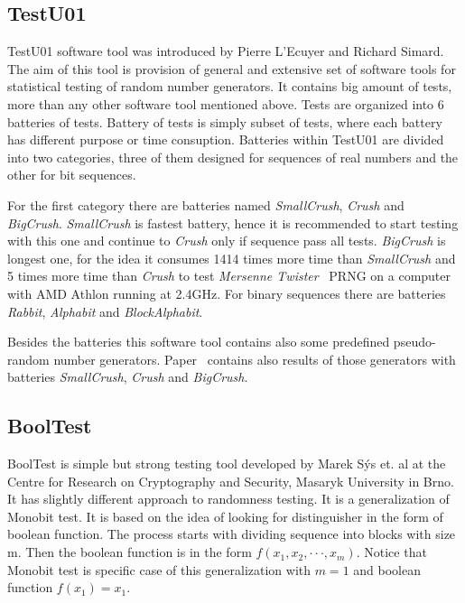 \documentclass[
    digital,    %
    oneside,    %
    color,
    11pt,
    nocover,
    notable,
    nolof,
    nolot,
    final
]{fithesis3}
\begin{document}
\subsection{TestU01}

TestU01 software tool was introduced by Pierre L'Ecuyer and Richard Simard. The aim of this tool is provision of general and extensive set of software tools for statistical testing of random number generators. It contains big amount of tests, more than any other software tool mentioned above. Tests are organized into 6 batteries of tests. Battery of tests is simply subset of tests, where each battery has different purpose or time consuption. Batteries within TestU01 are divided into two categories, three of them designed for sequences of real numbers and the other for bit sequences. 

For the first category there are batteries named \textit{SmallCrush}, \textit{Crush} and \textit{BigCrush}. \textit{SmallCrush} is fastest battery, hence it is recommended to start testing with this one and continue to \textit{Crush} only if sequence pass all tests. \textit{BigCrush} is longest one, for the idea it consumes 1414 times more time than \textit{SmallCrush} and 5 times more time than \textit{Crush} to test \textit{Mersenne Twister}~\cite{Matsumoto:1998:MTE:272991.272995} PRNG on a computer with AMD Athlon running at 2.4GHz. For binary sequences there are batteries \textit{Rabbit}, \textit{Alphabit} and \textit{BlockAlphabit}. \cite{l2007testu01}

Besides the batteries this software tool contains also some predefined pseudo-random number generators. Paper~\cite{l2007testu01} contains also results of those generators with batteries \textit{SmallCrush}, \textit{Crush} and \textit{BigCrush}.

\subsection{BoolTest}

BoolTest is simple but strong testing tool developed by Marek Sýs et. al at the Centre for Research on Cryptography and Security, Masaryk University in Brno. It has slightly different approach to randomness testing. It is a generalization of Monobit test. It is based on the idea of looking for distinguisher in the form of boolean function. The process starts with dividing sequence into blocks with size m. Then the boolean function is in the form $f(x_{1}, x_{2}, \cdot \cdot \cdot, x_{m})$. Notice that Monobit test is specific case of this generalization with $m = 1$ and boolean function $f(x_{1}) = x_{1}$. 
\end{document}
